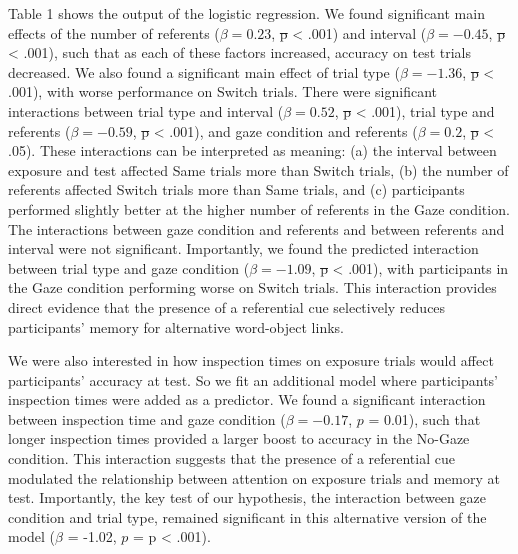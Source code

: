 \documentclass[authoryear, review]{elsarticle}
\providecommand{\DIFaddtex}[1]{{\protect\color{blue}\uwave{#1}}} %
\providecommand{\DIFdeltex}[1]{{\protect\color{red}\sout{#1}}}                      %
\providecommand{\DIFaddbegin}{} %
\providecommand{\DIFaddend}{} %
\providecommand{\DIFdelbegin}{} %
\providecommand{\DIFdelend}{} %
\providecommand{\DIFadd}[1]{\texorpdfstring{\DIFaddtex{#1}}{#1}} %
\providecommand{\DIFdel}[1]{\texorpdfstring{\DIFdeltex{#1}}{}} %
\begin{document}
Table 1 shows the output of the logistic regression. We found
significant main effects of the number of referents (\(\beta = 0.23\),
\DIFdelbegin \DIFdel{p
}\DIFdelend \DIFaddbegin \DIFadd{\(p\) }\DIFaddend \textless{} .001) and interval (\(\beta = -0.45\), \DIFdelbegin \DIFdel{p }\DIFdelend \DIFaddbegin \DIFadd{\(p\)
}\DIFaddend \textless{} .001), such that as each of these factors increased,
accuracy on test trials decreased. We also found a significant main
effect of trial type (\(\beta = -1.36\), \DIFdelbegin \DIFdel{p }\DIFdelend \DIFaddbegin \DIFadd{\(p\) }\DIFaddend \textless{} .001), with
worse performance on Switch trials. There were significant interactions
between trial type and interval (\(\beta = 0.52\), \DIFdelbegin \DIFdel{p }\DIFdelend \DIFaddbegin \DIFadd{\(p\) }\DIFaddend \textless{}
.001), trial type and referents (\(\beta = -0.59\), \DIFdelbegin \DIFdel{p }\DIFdelend \DIFaddbegin \DIFadd{\(p\) }\DIFaddend \textless{}
.001), and gaze condition and referents (\(\beta = 0.2\), \DIFdelbegin \DIFdel{p }\DIFdelend \DIFaddbegin \DIFadd{\(p\)
}\DIFaddend \textless{} .05). These interactions can be interpreted as meaning: (a)
the interval between exposure and test affected Same trials more than
Switch trials, (b) the number of referents affected Switch trials more
than Same trials, and (c) participants performed slightly better at the
higher number of referents in the Gaze condition. The interactions
between gaze condition and referents and between referents and interval
were not significant. Importantly, we found the predicted interaction
between trial type and gaze condition (\(\beta = -1.09\), \DIFdelbegin \DIFdel{p }\DIFdelend \DIFaddbegin \DIFadd{\(p\)
}\DIFaddend \textless{} .001), with participants in the Gaze condition performing
worse on Switch trials. This interaction provides direct evidence that
the presence of a referential cue selectively reduces participants'
memory for alternative word-object links.

We were also interested in how inspection times on exposure trials would
affect participants' accuracy at test. So we fit an additional model
where participants' inspection times were added as a predictor. We found
a significant interaction between inspection time and gaze condition
(\(\beta = -0.17\), \(p\) = 0.01), such that longer inspection times
provided a larger boost to accuracy in the No-Gaze condition. This
interaction suggests that the presence of a referential cue modulated
the relationship between attention on exposure trials and memory at
test. Importantly, the key test of our hypothesis, the interaction
between gaze condition and trial type, remained significant in this
alternative version of the model (\(\beta\) = -1.02, \(p\) = p
\textless{} .001).
\end{document}
